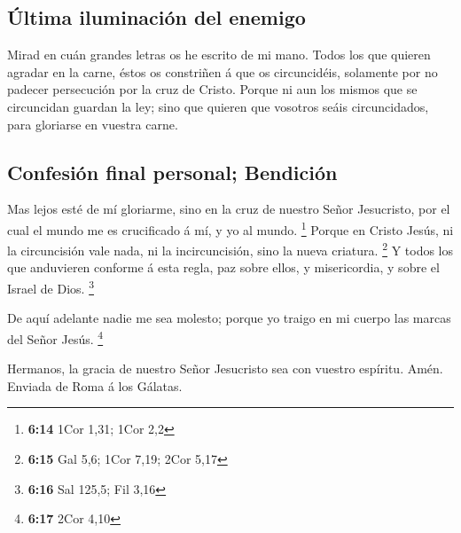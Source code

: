 \hypertarget{uxfaltima-iluminaciuxf3n-del-enemigo}{%
\subsection{Última iluminación del
enemigo}\label{uxfaltima-iluminaciuxf3n-del-enemigo}}

 Mirad en cuán grandes letras os he escrito de mi mano.
 Todos los que quieren agradar en la carne, éstos os
constriñen á que os circuncidéis, solamente por no padecer persecución
por la cruz de Cristo.  Porque ni aun los mismos que se
circuncidan guardan la ley; sino que quieren que vosotros seáis
circuncidados, para gloriarse en vuestra carne.

\hypertarget{confesiuxf3n-final-personal-bendiciuxf3n}{%
\subsection{Confesión final personal;
Bendición}\label{confesiuxf3n-final-personal-bendiciuxf3n}}

 Mas lejos esté de mí gloriarme, sino en la cruz de nuestro
Señor Jesucristo, por el cual el mundo me es crucificado á mí, y yo al
mundo. \footnote{\textbf{6:14} 1Cor 1,31; 1Cor 2,2}  Porque
en Cristo Jesús, ni la circuncisión vale nada, ni la incircuncisión,
sino la nueva criatura. \footnote{\textbf{6:15} Gal 5,6; 1Cor 7,19; 2Cor
  5,17}  Y todos los que anduvieren conforme á esta regla,
paz sobre ellos, y misericordia, y sobre el Israel de Dios. \footnote{\textbf{6:16}
  Sal 125,5; Fil 3,16}

 De aquí adelante nadie me sea molesto; porque yo traigo en
mi cuerpo las marcas del Señor Jesús. \footnote{\textbf{6:17} 2Cor 4,10}

 Hermanos, la gracia de nuestro Señor Jesucristo sea con
vuestro espíritu. Amén. Enviada de Roma á los Gálatas.
